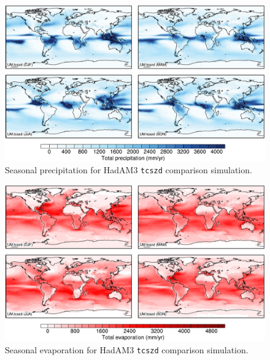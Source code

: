 \documentclass[a4paper,11pt,article]{article}
\begin{document}
\begin{figure}
  \begin{center}
    \includegraphics[width=\textwidth]{../hadam3-comparison/plots/pp-plots}
  \end{center}
  \caption{Seasonal precipitation for HadAM3 \texttt{tcszd} comparison
    simulation.}
  \label{fig:pp-hadam3}
\end{figure}

\begin{figure}
  \begin{center}
    \includegraphics[width=\textwidth]{../hadam3-comparison/plots/evap-plots}
  \end{center}
  \caption{Seasonal evaporation for HadAM3 \texttt{tcszd} comparison
    simulation.}
  \label{fig:evap-hadam3}
\end{figure}
\end{document}
